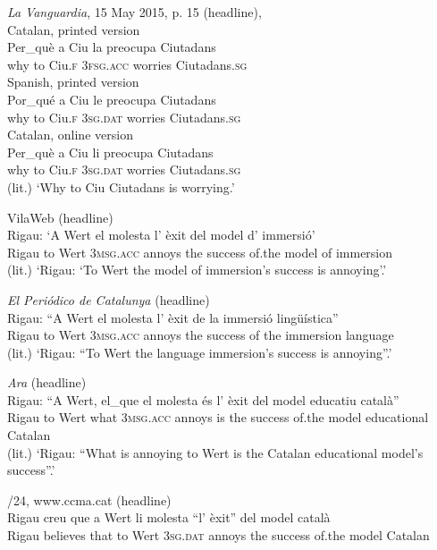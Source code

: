 \documentclass[output=paper,colorlinks,citecolor=brown,modfonts,nonflat]{langsci/langscibook}
\begin{document}
\ea%
 \emph{La} \emph{Vanguardia}, 15 May 2015, p. 15 (headline),
 \label{ex:royo:5}\\
 \ea Catalan, printed version \label{ex:royo:5a}\\
 \gll Per\_què a Ciu la preocupa Ciutadans \\
why      to Ciu.\textsc{f} 3\textsc{fsg.acc} worries   Ciutadans.\textsc{sg} \\


 \ex Spanish, printed version \label{ex:royo:5b}\\
 \gll Por\_qué a Ciu le preocupa Ciutadans\\
why      to Ciu.\textsc{f} \textsc{3sg.dat} worries    Ciutadans.\textsc{sg}\\


\ex Catalan, online version \label{ex:royo:5c}\\
 \gll Per\_què a Ciu li preocupa Ciutadans \\
	why      to Ciu.\textsc{f} 3\textsc{sg.dat} worries    Ciutadans.\textsc{sg}\\
 \glt (lit.) ‘Why to Ciu Ciutadans is worrying.’

 \z
 \z


\ea%
 \label{ex:royo:6}
 \ea VilaWeb (headline)\\
 \gll Rigau: ‘A Wert el molesta l’ èxit del model d’ immersió’\\
Rigau   to Wert \textsc{3msg.acc} annoys   the success of.the model of immersion\\
 \glt (lit.) ‘Rigau: ‘To Wert the model of immersion’s success is annoying’.’

 \ex \textit{El Periódico de Catalunya} (headline)\\
 \gll Rigau: “A Wert el molesta l’ èxit de la immersió lingüística”\\
 Rigau   to Wert 3\textsc{msg.acc} annoys  the success of the immersion language\\
 \glt (lit.) ‘Rigau: “To Wert the language immersion’s success is annoying”.’

 \ex \textit{Ara} (headline)\\
 \gll Rigau: “A Wert, el\_que el molesta és l’ èxit del model educatiu català”\\
Rigau    to Wert what   \textsc{3msg.acc} annoys  is the success of.the model educational Catalan\\
 \glt (lit.) ‘Rigau: “What is annoying to Wert is the Catalan educational model’s success”.’
 \z
 \z


\ea%
 \label{ex:royo:7}
 /24, www.ccma.cat (headline)\\
 \gll Rigau creu que a Wert li molesta “l' èxit” del model català\\
  Rigau believes that to Wert \textsc{3sg.dat} annoys the success of.the model Catalan\\
\end{document}
